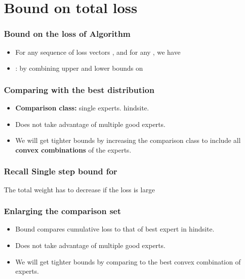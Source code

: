 \documentclass{beamer}
\begin{document}
\section{Bound on total loss}
\begin{frame}
\frametitle{Bound on the loss of \ouralg Algorithm}
\begin{itemize}
\item
\begin{theorem} \label{thm:basic-bnd}
For any sequence of loss vectors ,
and for any , we have
\end{theorem}
\item
{}: by combining upper and lower bounds on 
\end{itemize}
\end{frame}


\begin{frame}
  \frametitle{Comparing with the best distribution}
  \begin{itemize}
  \item {\bf Comparison class:} single experts.
    hindsite.
  \item Does not take advantage of multiple good experts.
  \item We will get tighter bounds by increasing the comparison class
    to include all {\bf convex combinations} of the experts.
  \end{itemize}
\end{frame}

\begin{frame}
\frametitle{Recall Single step bound for \ouralg}
The total weight has to decrease if the loss is large
\end{frame}

\begin{frame}
  \frametitle{Enlarging the comparison set}
  \begin{itemize}
  \item Bound compares cumulative loss to that of best expert in
    hindsite.
  \item Does not take advantage of multiple good experts.
  \item We will get tighter bounds by comparing to the best convex
    combination of experts.
  \end{itemize}
\end{frame}
\end{document}

